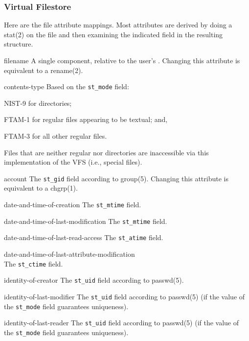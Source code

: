 \subsubsection	{Virtual Filestore}
Here are the file attribute mappings.
Most attributes are derived by doing a \man stat(2) on the file and then
examining the indicated field in the resulting structure.
\begin{describe}
\item[filename]
A single component, relative to the user's .
Changing this attribute is equivalent to a \man rename(2).

\item[contents-type]
Based on the \verb"st_mode" field:
\begin{describe}
\item[NIST-9]	for directories;

\item[FTAM-1]	for regular files appearing to be textual;
and,

\item[FTAM-3]	for all other regular files.
\end{describe}
Files that are neither regular nor directories are inaccessible via this
implementation of the VFS (i.e., special files).

\item[account]
The \verb"st_gid" field according to \man group(5).
Changing this attribute is equivalent to a \man chgrp(1).

\item[date-and-time-of-creation]
The \verb"st_mtime" field.

\item[date-and-time-of-last-modification]
The \verb"st_mtime" field.

\item[date-and-time-of-last-read-access]
The \verb"st_atime" field.

\item[date-and-time-of-last-attribute-modification]
\ \\	%
The \verb"st_ctime" field.

\item[identity-of-creator]
The \verb"st_uid" field according to \man passwd(5).

\item[identity-of-last-modifier]
The \verb"st_uid" field according to \man passwd(5)
(if the value of the \verb"st_mode" field guarantees uniqueness).

\item[identity-of-last-reader]
The \verb"st_uid" field according to \man passwd(5)
(if the value of the \verb"st_mode" field guarantees uniqueness).


\end{describe}
